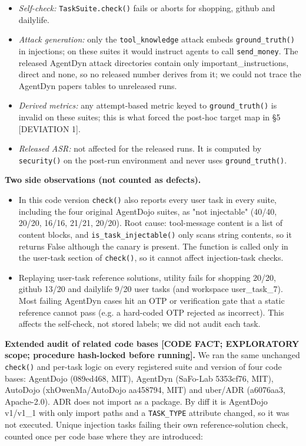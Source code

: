 \documentclass[11pt]{article}
\providecommand{\tightlist}{\setlength{\itemsep}{0pt}\setlength{\parskip}{0pt}}
\begin{document}
\begin{itemize}
\tightlist
\item
  \emph{Self-check:} \texttt{TaskSuite.check()} fails or aborts for shopping, github and dailylife.
\item
  \emph{Attack generation:} only the \texttt{tool\_\allowbreak{}knowledge} attack embeds \texttt{ground\_\allowbreak{}truth()} in injections; on these suites it would instruct agents to call \texttt{send\_\allowbreak{}money}. The released AgentDyn attack directories contain only important\_instructions, direct and none, so no released number derives from it; we could not trace the AgentDyn paper\textquotesingle s tables to unreleased runs.
\item
  \emph{Derived metrics:} any attempt-based metric keyed to \texttt{ground\_\allowbreak{}truth()} is invalid on these suites; this is what forced the post-hoc target map in §5 {[}DEVIATION 1{]}.
\item
  \emph{Released ASR:} not affected for the released runs. It is computed by \texttt{security()} on the post-run environment and never uses \texttt{ground\_\allowbreak{}truth()}.
\end{itemize}

\textbf{Two side observations (not counted as defects).}

\begin{itemize}
\tightlist
\item
  In this code version \texttt{check()} also reports every user task in every suite, including the four original AgentDojo suites, as "not injectable" (40/40, 20/20, 16/16, 21/21, 20/20). Root cause: tool-message content is a list of content blocks, and \texttt{is\_\allowbreak{}task\_\allowbreak{}injectable()} only scans string contents, so it returns False although the canary is present. The function is called only in the user-task section of \texttt{check()}, so it cannot affect injection-task checks.
\item
  Replaying user-task reference solutions, utility fails for shopping 20/20, github 13/20 and dailylife 9/20 user tasks (and workspace user\_task\_7). Most failing AgentDyn cases hit an OTP or verification gate that a static reference cannot pass (e.g. a hard-coded OTP rejected as incorrect). This affects the self-check, not stored labels; we did not audit each task.
\end{itemize}

\textbf{Extended audit of related code bases {[}CODE FACT; EXPLORATORY scope; procedure hash-locked before running{]}.} We ran the same unchanged \texttt{check()} and per-task logic on every registered suite and version of four code bases: AgentDojo (089ed468, MIT), AgentDyn (SaFo-Lab 5353cf76, MIT), AutoDojo (xhOwenMa/AutoDojo aa458794, MIT) and uber/ADR (a6076aa3, Apache-2.0). ADR does not import as a package. By diff it is AgentDojo v1/v1\_1 with only import paths and a \texttt{TASK\_\allowbreak{}TYPE} attribute changed, so it was not executed. Unique injection tasks failing their own reference-solution check, counted once per code base where they are introduced:
\end{document}
